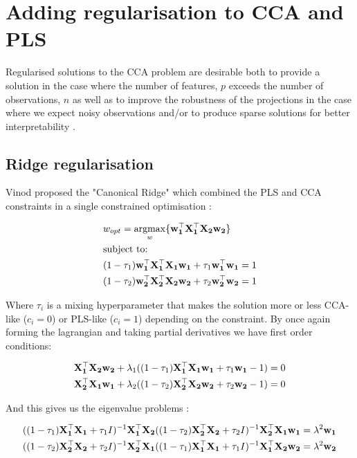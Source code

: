 \section{Adding regularisation to CCA and PLS}

Regularised solutions to the CCA problem are desirable both to provide a solution in the case where the number of features, $p$ exceeds the number of observations, $n$ as well as to improve the robustness of the projections in the case where we expect noisy observations \cite{branco2005robust} and/or to produce sparse solutions for better interpretability \cite{parkhomenko2009sparse}.

\subsection{Ridge regularisation}\label{sec:Regularised CCA}

Vinod proposed the "Canonical Ridge" which combined the PLS and CCA constraints in a single constrained optimisation \cite{vinod1976canonical}:

\begin{align}
    & w_{opt}=\underset{w}{\mathrm{argmax}}\{\bold{w_1^{\top}X_1^{\top}X_2w_2}\}\\
    & \text{subject to:} \notag\\
    & (1-\tau_1)\bold{w_1^{\top}X_1^{\top}X_1w_1}+\tau_1\bold{w_1^{\top}w_1}=1 \notag\\
    & (1-\tau_2)\bold{w_2^{\top}X_2^{\top}X_2w_2}+\tau_2\bold{w_2^{\top}w_2}=1 \notag
\end{align}

Where $\tau_i$ is a mixing hyperparameter that makes the solution more or less CCA-like ($c_i=0$) or PLS-like ($c_i=1$) depending on the constraint. By once again forming the lagrangian and taking partial derivatives we have first order conditions:

\begin{align}
    & \bold{X_1^{\top}X_2w_2} + \lambda_1((1-\tau_1)\bold{X_1^{\top}X_1w_1}+\tau_1\bold{w_1}-1)=0\\
    & \bold{X_2^{\top}X_1w_1} + \lambda_2((1-\tau_2)\bold{X_2^{\top}X_2w_2}+\tau_2\bold{w_2}-1)=0
\end{align}

And this gives us the eigenvalue problems \cite{rosipal2005overview}:

\begin{align}
    & ((1-\tau_1)\bold{X_1^{\top}X_1}+\tau_1I)^{-1}\bold{X_1^{\top}X_2}((1-\tau_2)\bold{X_2^{\top}X_2}+\tau_2I)^{-1}\bold{X_2^{\top}X_1w_1}=\lambda^2\bold{w_1} \notag\\
    & ((1-\tau_2)\bold{X_2^{\top}X_2}+\tau_2I)^{-1}\bold{X_2^{\top}X_1}((1-\tau_1)\bold{X_1^{\top}X_1}+\tau_1I)^{-1}\bold{X_1^{\top}X_2w_2}=\lambda^2\bold{w_2}
\end{align}

